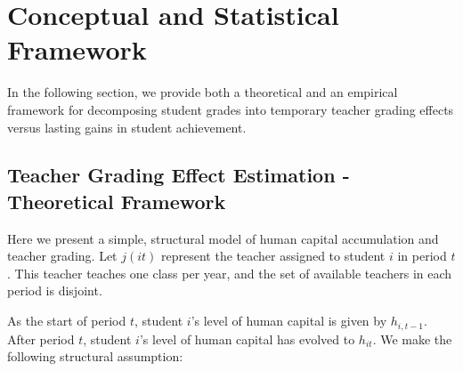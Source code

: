 \documentclass[../thesis_main.tex]{subfiles}
\begin{document}
\doublespacing
\section{Conceptual and Statistical Framework}
\label{section:framework}

In the following section, we provide both a theoretical and an empirical framework for decomposing student grades into temporary teacher grading effects versus lasting gains in student achievement. 

\subsection{Teacher Grading Effect Estimation - Theoretical Framework}

Here we present a simple, structural model of human capital accumulation and teacher grading. Let $j(it)$ represent the teacher assigned to student $i$ in period $t$. This teacher teaches one class per year, and the set of available teachers in each period is disjoint.

As the start of period $t$, student $i$'s level of human capital is given by $h_{i,t-1}$. After period $t$, student $i$'s level of human capital has evolved to $h_{it}$. We make the following structural assumption:

\bigskip 
\noindent{}\\

\end{document}

